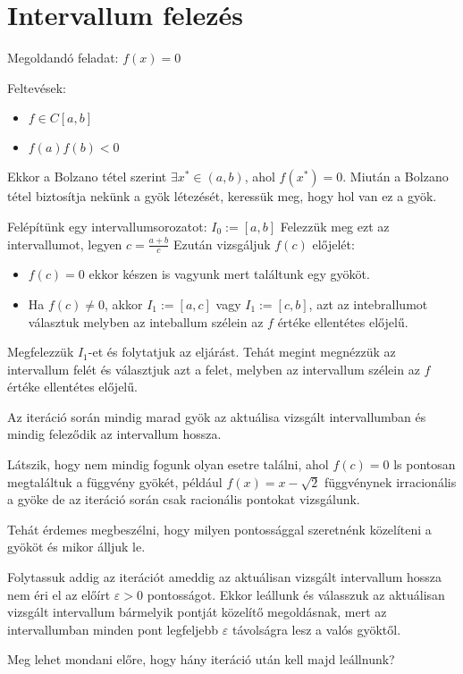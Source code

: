 \section{Intervallum felezés}
Megoldandó feladat: $f(x) = 0$

Feltevések:
\begin{itemize}
    \item $f \in C[a, b]$
    \item $f(a)f(b) < 0$
\end{itemize}
Ekkor a Bolzano tétel szerint $\exists x^{*} \in (a, b)$,  ahol $f(x^{*}) = 0$. Miután a Bolzano tétel biztosítja nekünk a gyök létezését, keressük meg, hogy hol van ez a gyök.

Felépítünk egy intervallumsorozatot:
$I_{0} := [a, b]$
Felezzük meg ezt az intervallumot, legyen $c = \frac{a+b}{c}$
Ezután vizsgáljuk $f(c)$ előjelét:
\begin{itemize}
    \item $f(c) = 0$ ekkor készen is vagyunk mert találtunk egy gyököt.
    \item Ha $f(c) \neq 0$, akkor $I_{1} := [a, c]$ vagy $I_{1} := [c, b]$, azt az intebrallumot választuk melyben az inteballum szélein az $f$ értéke ellentétes előjelű.
\end{itemize}

Megfelezzük $I_{1}$-et és folytatjuk az eljárást. Tehát megint megnézzük az intervallum felét és választjuk azt a felet, melyben az intervallum szélein az $f$ értéke ellentétes előjelű.

Az iteráció során mindig marad gyök az aktuálisa vizsgált intervallumban és mindig feleződik az intervallum hossza.

Látszik, hogy nem mindig fogunk olyan esetre találni, ahol $f(c) = 0$ ls pontosan megtaláltuk a függvény gyökét, például $f(x) = x - \sqrt{ 2 }$ függvénynek irracionális a gyöke de az iteráció során csak racionális pontokat vizsgálunk.

Tehát érdemes megbeszélni, hogy milyen pontossággal szeretnénk közelíteni a gyököt és mikor álljuk le.

Folytassuk addig az iterációt ameddig az aktuálisan vizsgált intervallum hossza nem éri el az előírt $\varepsilon > 0$ pontosságot.
Ekkor leállunk és válasszuk az aktuálisan vizsgált intervallum bármelyik pontját közelítő megoldásnak, mert az intervallumban minden pont legfeljebb $\varepsilon$ távolságra lesz a valós gyöktől.

Meg lehet mondani előre, hogy hány iteráció után kell majd leállnunk?


